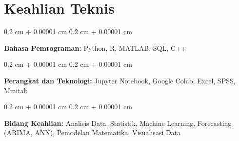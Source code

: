 \documentclass[10pt, letterpaper]{article}
\newenvironment{onecolentry}{
    \begin{adjustwidth}{
        0.2 cm + 0.00001 cm
    }{
        0.2 cm + 0.00001 cm
    }
}{
    \end{adjustwidth}
} %
\begin{document}
    
    \section{Keahlian Teknis}

\begin{onecolentry}
    \textbf{Bahasa Pemrograman:} Python, R, MATLAB, SQL, C++
\end{onecolentry}

\vspace{0.2 cm}

\begin{onecolentry}
    \textbf{Perangkat dan Teknologi:} Jupyter Notebook, Google Colab, Excel, SPSS, Minitab
\end{onecolentry}

\vspace{0.2 cm}

\begin{onecolentry}
    \textbf{Bidang Keahlian:} Analisis Data, Statistik, Machine Learning, Forecasting (ARIMA, ANN), Pemodelan Matematika, Visualisasi Data
\end{onecolentry}



    
\end{document}
